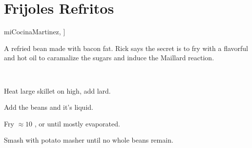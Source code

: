 \section{Frijoles Refritos}


\begin{recipestats}[
	preptime=5 \minute,
	servings=6 C,
	bakingtime=20 \minute,
	original=\citeauthor{miCocinaMartinez}~\cite[p.55]{miCocinaMartinez},
]
\end{recipestats}


\begin{recipeabstract}
	A refried bean made with bacon fat.
	Rick says the secret is to fry with a flavorful and hot oil to caramalize the sugars and induce the Maillard reaction.
\end{recipeabstract}


\begin{ingredientcolumns}[1]
	\begin{ingredientblock}
		\\
	\end{ingredientblock}
\end{ingredientcolumns}


\begin{preparation}
	\item Heat large skillet on high, add lard.
	\item Add the beans and it's liquid.
	\item Fry $\approx 10$ \minute, or until mostly evaporated.
	\item Smash with potato masher until no whole beans remain.
\end{preparation}


\recipeend%
